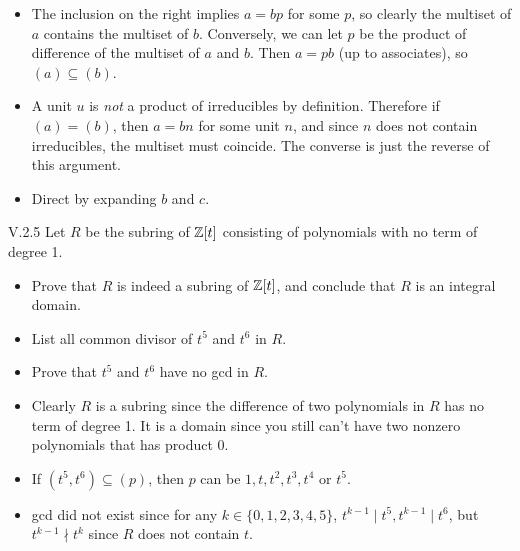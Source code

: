 \begin{pf}
\begin{itemize}	
    \setlength\itemsep{0pt}
    \item The inclusion on the right implies $a = bp$ for some $p$, so clearly the multiset of $a$ contains the multiset of $b$. Conversely, we can let $p$ be the product of difference of the multiset of $a$ and $b$. Then $a = pb$ (up to associates), so $(a)\subseteq(b)$.
    \item A unit $u$ is \emph{not} a product of irreducibles by definition. Therefore if $(a) = (b)$, then $a = bn$ for some unit $n$, and since $n$ does not contain irreducibles, the multiset must coincide. The converse is just the reverse of this argument.
    \item Direct by expanding $b$ and $c$.
\end{itemize}
\end{pf}

\begin{problem}{V.2.5}
Let $R$ be the subring of $\mathbb{Z}[t]$ consisting of polynomials with no term of degree 1.
\begin{itemize}
    \setlength\itemsep{0pt}
    \item Prove that $R$ is indeed a subring of $\mathbb{Z}[t]$, and conclude that $R$ is an integral domain.
    \item List all common divisor of $t^5$ and $t^6$ in $R$.
    \item Prove that $t^5$ and $t^6$ have no gcd in $R$.
\end{itemize}
\end{problem}
\begin{pf}
\begin{itemize}
    \setlength\itemsep{0pt}
    \item Clearly $R$ is a subring since the difference of two polynomials in $R$ has no term of degree 1. It is a domain since you still can't have two nonzero polynomials that has product $0$.
    \item If $(t^5, t^6) \subseteq (p)$, then $p$ can be $1, t, t^2, t^3, t^4$ or $t^5$.
    \item gcd did not exist since for any $k \in \{0,1,2,3,4,5\}$, $t^{k-1} \mid t^5, t^{k-1} \mid t^6$, but $t^{k-1} \nmid t^k$ since $R$ does not contain $t$.
\end{itemize}
\end{pf}

